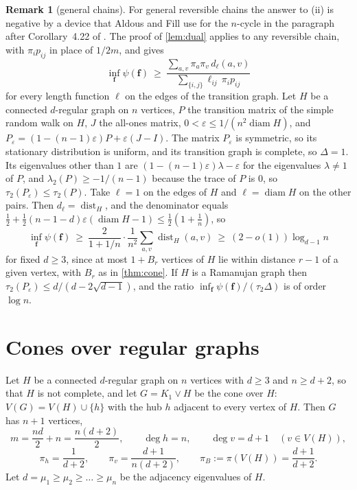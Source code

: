 \documentclass[11pt]{amsart}
\theoremstyle{definition}
\newtheorem{remark}[theorem]{Remark}
\newcommand{\bfF}{\mathbf{f}}
\DeclareMathOperator{\dist}{dist}
\begin{document}
\begin{remark}[general chains]\label{rem:general}
For general reversible chains the answer to (ii) is negative by a device that Aldous and Fill use for the $n$-cycle in the paragraph after Corollary~4.22 of \cite{AF}. The proof of \cref{lem:dual} applies to any reversible chain, with $\pi_ip_{ij}$ in place of $1/2m$, and gives
\[
\inf_{\bfF}\psi(\bfF)\ \ge\ \frac{\sum_{a,v}\pi_a\pi_v\,d_\ell(a,v)}{\sum_{\{i,j\}}\ell_{ij}\,\pi_ip_{ij}}
\]
for every length function $\ell$ on the edges of the transition graph. Let $H$ be a connected $d$-regular graph on $n$ vertices, $P$ the transition matrix of the simple random walk on $H$, $J$ the all-ones matrix, $0<\varepsilon\le1/(n^2\operatorname{diam}H)$, and $P_\varepsilon=(1-(n-1)\varepsilon)P+\varepsilon(J-I)$. The matrix $P_\varepsilon$ is symmetric, so its stationary distribution is uniform, and its transition graph is complete, so $\Delta=1$. Its eigenvalues other than $1$ are $(1-(n-1)\varepsilon)\lambda-\varepsilon$ for the eigenvalues $\lambda\ne1$ of $P$, and $\lambda_2(P)\ge-1/(n-1)$ because the trace of $P$ is $0$, so $\tau_2(P_\varepsilon)\le\tau_2(P)$. Take $\ell=1$ on the edges of $H$ and $\ell=\operatorname{diam}H$ on the other pairs. Then $d_\ell=\dist_H$, and the denominator equals $\frac12+\frac12(n-1-d)\varepsilon(\operatorname{diam}H-1)\le\frac12(1+\frac1n)$, so
\[
\inf_{\bfF}\psi(\bfF)\ \ge\ \frac{2}{1+1/n}\cdot\frac1{n^2}\sum_{a,v}\dist_H(a,v)\ \ge\ (2-o(1))\log_{d-1}n
\]
for fixed $d\ge3$, since at most $1+B_r$ vertices of $H$ lie within distance $r-1$ of a given vertex, with $B_r$ as in \cref{thm:cone}. If $H$ is a Ramanujan graph then $\tau_2(P_\varepsilon)\le d/(d-2\sqrt{d-1})$, and the ratio $\inf_{\bfF}\psi(\bfF)/(\tau_2\Delta)$ is of order $\log n$.
\end{remark}

\section{Cones over regular graphs}\label{sec:cones}

Let $H$ be a connected $d$-regular graph on $n$ vertices with $d\ge3$ and $n\ge d+2$, so that $H$ is not complete, and let $G=K_1\vee H$ be the cone over $H$: $V(G)=V(H)\cup\{h\}$ with the hub $h$ adjacent to every vertex of $H$. Then $G$ has $n+1$ vertices,
\[
m=\frac{nd}2+n=\frac{n(d+2)}2,\qquad \deg h=n,\qquad \deg v=d+1\quad(v\in V(H)),
\]
\[
\pi_h=\frac1{d+2},\qquad \pi_v=\frac{d+1}{n(d+2)},\qquad \pi_B:=\pi(V(H))=\frac{d+1}{d+2}.
\]
Let $d=\mu_1\ge\mu_2\ge\dots\ge\mu_n$ be the adjacency eigenvalues of $H$.
\end{document}
